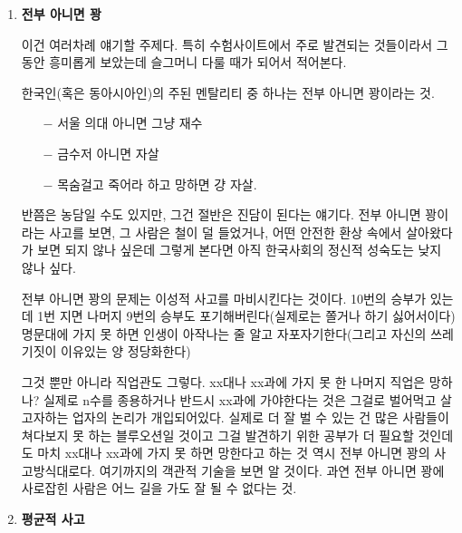 \vspace{5mm}
\begin{enumerate}

    \item \textbf{ 전부 아니면 꽝}
    \vspace{5mm}

    이건 여러차례 얘기할 주제다.
    특히 수험사이트에서 주로 발견되는 것들이라서 그동안 흥미롭게 보았는데 슬그머니 다룰 때가 되어서 적어본다.
    \vspace{5mm}

    한국인(혹은 동아시아인)의 주된 멘탈리티 중 하나는 전부 아니면 꽝이라는 것.
    \vspace{5mm}

    \begin{itemize}
        \item[$-$]  서울 의대 아니면 그냥 재수
        \item[$-$]  금수저 아니면 자살
        \item[$-$]  목숨걸고 죽어라 하고 망하면 걍 자살.
    \end{itemize}
    \vspace{5mm}

    반쯤은 농담일 수도 있지만, 그건 절반은 진담이 된다는 얘기다.
    전부 아니면 꽝이라는 사고를 보면, 그 사람은 철이 덜 들었거나, 어떤 안전한 환상 속에서 살아왔다가 보면 되지 않나 싶은데
    그렇게 본다면 아직 한국사회의 정신적 성숙도는 낮지 않나 싶다.
    \vspace{5mm}

    전부 아니면 꽝의 문제는 이성적 사고를 마비시킨다는 것이다.
    10번의 승부가 있는데 1번 지면 나머지 9번의 승부도 포기해버린다(실제로는 쫄거나 하기 싫어서이다)
    명문대에 가지 못 하면 인생이 아작나는 줄 알고 자포자기한다(그리고 자신의 쓰레기짓이 이유있는 양 정당화한다)
    \vspace{5mm}

    그것 뿐만 아니라 직업관도 그렇다.
    xx대나 xx과에 가지 못 한 나머지 직업은 망하나?
    실제로 n수를 종용하거나 반드시 xx과에 가야한다는 것은 그걸로 벌어먹고 살고자하는 업자의 논리가 개입되어있다.
    실제로 더 잘 벌 수 있는 건 많은 사람들이 쳐다보지 못 하는 블루오션일 것이고 그걸 발견하기 위한 공부가 더 필요할 것인데도
    마치 xx대나 xx과에 가지 못 하면 망한다고 하는 것 역시 전부 아니면 꽝의 사고방식대로다.
    여기까지의 객관적 기술을 보면 알 것이다. 과연 전부 아니면 꽝에 사로잡힌 사람은 어느 길을 가도 잘 될 수 없다는 것.
    \vspace{5mm}

    \item \textbf{ 평균적 사고}
    \vspace{5mm}


\end{enumerate}
